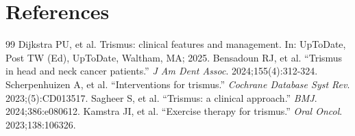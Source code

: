 \section*{References}
\begin{thebibliography}{99}
 Dijkstra PU, et al. Trismus: clinical features and management. In: UpToDate, Post TW (Ed), UpToDate, Waltham, MA; 2025.
 Bensadoun RJ, et al. ``Trismus in head and neck cancer patients.'' \emph{J Am Dent Assoc}. 2024;155(4):312-324.
 Scherpenhuizen A, et al. ``Interventions for trismus.'' \emph{Cochrane Database Syst Rev}. 2023;(5):CD013517.
 Sagheer S, et al. ``Trismus: a clinical approach.'' \emph{BMJ}. 2024;386:e080612.
 Kamstra JI, et al. ``Exercise therapy for trismus.'' \emph{Oral Oncol}. 2023;138:106326.
\end{thebibliography}
